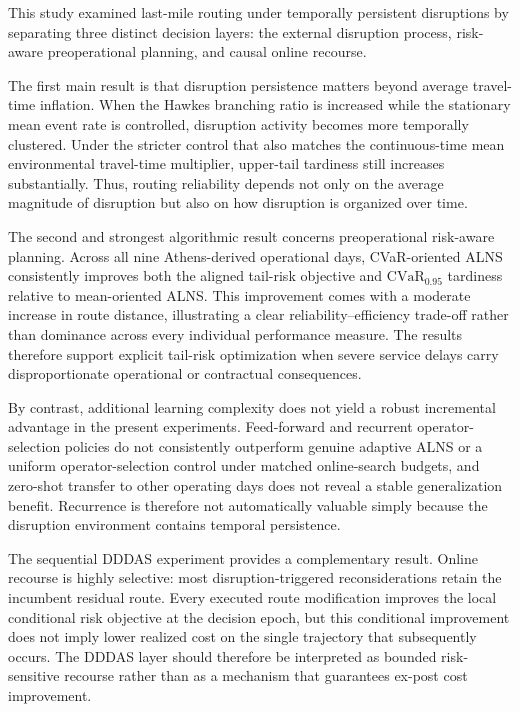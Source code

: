 \documentclass[preprint,12pt]{elsarticle}
\newcommand{\CVaR}{\mathrm{CVaR}}
\newcommand{\1}{\mathbf{1}}
\begin{document}
This study examined last-mile routing under temporally persistent disruptions
by separating three distinct decision layers: the external disruption process,
risk-aware preoperational planning, and causal online recourse.

The first main result is that disruption persistence matters beyond average
travel-time inflation. When the Hawkes branching ratio is increased while the
stationary mean event rate is controlled, disruption activity becomes more
temporally clustered. Under the stricter control that also matches the
continuous-time mean environmental travel-time multiplier, upper-tail
tardiness still increases substantially. Thus, routing reliability depends not
only on the average magnitude of disruption but also on how disruption is
organized over time.

The second and strongest algorithmic result concerns preoperational risk-aware
planning. Across all nine Athens-derived operational days,
CVaR-oriented ALNS consistently improves both the aligned tail-risk objective
and $\CVaR_{0.95}$ tardiness relative to mean-oriented ALNS. This improvement
comes with a moderate increase in route distance, illustrating a clear
reliability--efficiency trade-off rather than dominance across every individual
performance measure. The results therefore support explicit tail-risk
optimization when severe service delays carry disproportionate operational or
contractual consequences.

By contrast, additional learning complexity does not yield a robust incremental
advantage in the present experiments. Feed-forward and recurrent
operator-selection policies do not consistently outperform genuine adaptive
ALNS or a uniform operator-selection control under matched online-search
budgets, and zero-shot transfer to other operating days does not reveal a stable
generalization benefit. Recurrence is therefore not automatically valuable
simply because the disruption environment contains temporal persistence.

The sequential DDDAS experiment provides a complementary result. Online recourse
is highly selective: most disruption-triggered reconsiderations retain the
incumbent residual route. Every executed route modification improves the local
conditional risk objective at the decision epoch, but this conditional
improvement does not imply lower realized cost on the single trajectory that
subsequently occurs. The DDDAS layer should therefore be interpreted as bounded
risk-sensitive recourse rather than as a mechanism that guarantees ex-post
cost improvement.
\end{document}
